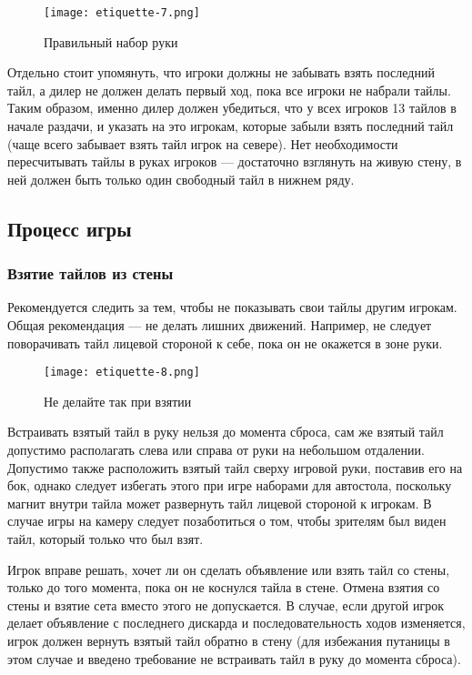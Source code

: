 \begin{figure}[H]
	\centering
	\texttt{[image: etiquette-7.png]}
	\caption{Правильный набор руки}
\end{figure}

Отдельно стоит упомянуть, что игроки должны не забывать взять последний тайл, а дилер не должен делать первый ход, пока все игроки не набрали тайлы. Таким образом, именно дилер должен убедиться, что у всех игроков 13 тайлов в начале раздачи, и указать на это игрокам, которые забыли взять последний тайл (чаще всего забывает взять тайл игрок на севере). Нет необходимости пересчитывать тайлы в руках игроков --- достаточно взглянуть на живую стену, в ней должен быть только один свободный тайл в нижнем ряду. 

\subsection{Процесс игры}

\subsubsection{Взятие тайлов из стены}

Рекомендуется следить за тем, чтобы не показывать свои тайлы другим игрокам. Общая рекомендация --- не делать лишних движений. Например, не следует поворачивать тайл лицевой стороной к себе, пока он не окажется в зоне руки.

\begin{figure}[H]
	\centering
	\texttt{[image: etiquette-8.png]}
	\caption{Не делайте так при взятии}
\end{figure}

Встраивать взятый тайл в руку нельзя до момента сброса, сам же взятый тайл допустимо располагать слева или справа от руки на небольшом отдалении. Допустимо также расположить взятый тайл сверху игровой руки, поставив его на бок, однако следует избегать этого при игре наборами для автостола, поскольку магнит внутри тайла может развернуть тайл лицевой стороной к игрокам. В случае игры на камеру следует позаботиться о том, чтобы зрителям был виден тайл, который только что был взят.

Игрок вправе решать, хочет ли он сделать объявление или взять тайл со стены, только до того момента, пока он не коснулся тайла в стене. Отмена взятия со стены и взятие сета вместо этого не допускается. В случае, если другой игрок делает объявление с последнего дискарда и последовательность ходов изменяется, игрок должен вернуть взятый тайл обратно в стену (для избежания путаницы в этом случае и введено требование не встраивать тайл в руку до момента сброса).


